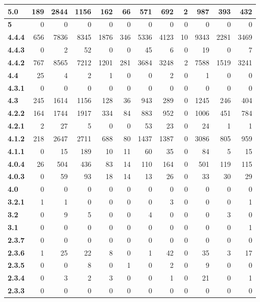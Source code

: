 \begin{table}[htbp]
{\begin{tabular}{|l|r|r|r|r|r|r|r|r|r|r|r|}
\textbf{5.0} & 189 & 2844 & 1156 & 162 & 66 & 571 & 692 & 2 & 987 & 393 & 432 \\ \hline
\textbf{5} & 0 & 0 & 0 & 0 & 0 & 0 & 0 & 0 & 0 & 0 & 0 \\ \hline
\textbf{4.4.4} & 656 & 7836 & 8345 & 1876 & 346 & 5336 & 4123 & 10 & 9343 & 2281 & 3469 \\ \hline
\textbf{4.4.3} & 0 & 2 & 52 & 0 & 0 & 45 & 6 & 0 & 19 & 0 & 7 \\ \hline
\textbf{4.4.2} & 767 & 8565 & 7212 & 1201 & 281 & 3684 & 3248 & 2 & 7588 & 1519 & 3241 \\ \hline
\textbf{4.4} & 25 & 4 & 2 & 1 & 0 & 0 & 2 & 0 & 1 & 0 & 0 \\ \hline
\textbf{4.3.1} & 0 & 0 & 0 & 0 & 0 & 0 & 0 & 0 & 0 & 0 & 0 \\ \hline
\textbf{4.3} & 245 & 1614 & 1156 & 128 & 36 & 943 & 289 & 0 & 1245 & 246 & 404 \\ \hline
\textbf{4.2.2} & 164 & 1744 & 1917 & 334 & 84 & 883 & 952 & 0 & 1006 & 451 & 784 \\ \hline
\textbf{4.2.1} & 2 & 27 & 5 & 0 & 0 & 53 & 23 & 0 & 24 & 1 & 1 \\ \hline
\textbf{4.1.2} & 218 & 2647 & 2711 & 688 & 80 & 1437 & 1387 & 0 & 3086 & 805 & 959 \\ \hline
\textbf{4.1.1} & 0 & 15 & 189 & 10 & 11 & 60 & 35 & 0 & 84 & 5 & 15 \\ \hline
\textbf{4.0.4} & 26 & 504 & 436 & 83 & 14 & 110 & 164 & 0 & 501 & 119 & 115 \\ \hline
\textbf{4.0.3} & 0 & 59 & 93 & 18 & 14 & 13 & 26 & 0 & 33 & 30 & 29 \\ \hline
\textbf{4.0} & 0 & 0 & 0 & 0 & 0 & 0 & 0 & 0 & 0 & 0 & 0 \\ \hline
\textbf{3.2.1} & 1 & 1 & 0 & 0 & 0 & 0 & 3 & 0 & 0 & 0 & 1 \\ \hline
\textbf{3.2} & 0 & 9 & 5 & 0 & 0 & 4 & 0 & 0 & 0 & 3 & 0 \\ \hline
\textbf{3.1} & 0 & 0 & 0 & 0 & 0 & 0 & 0 & 0 & 0 & 0 & 1 \\ \hline
\textbf{2.3.7} & 0 & 0 & 0 & 0 & 0 & 0 & 0 & 0 & 0 & 0 & 0 \\ \hline
\textbf{2.3.6} & 1 & 25 & 22 & 8 & 0 & 1 & 42 & 0 & 35 & 3 & 17 \\ \hline
\textbf{2.3.5} & 0 & 0 & 8 & 0 & 1 & 0 & 2 & 0 & 9 & 0 & 0 \\ \hline
\textbf{2.3.4} & 0 & 3 & 2 & 3 & 0 & 0 & 1 & 0 & 21 & 0 & 1 \\ \hline
\textbf{2.3.3} & 0 & 0 & 0 & 0 & 0 & 0 & 0 & 0 & 0 & 0 & 0 \\ \hline

\end{tabular}}
\end{table}
